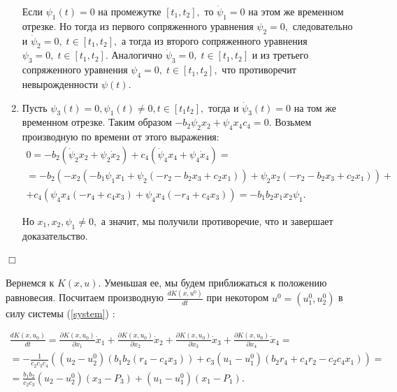 \documentclass[11pt]{article}
\newenvironment{Proof}
{\par\noindent{\bf Доказательство.\\}} 
{\begin{flushright}$\Box$\end{flushright}}
\newcommand\Ref[1]{(\ref{#1})}
\newcommand\RS{\Ref{system} }
\newcommand\dd[2]{\frac{\partial#1}{\partial#2}}
\begin{document}
\begin{Proof}
\begin{enumerate}
        Если $\psi_1(t) = 0$ на промежутке $[t_1, t_2],$ то $\dot \psi_1 = 0$ на этом же временном отрезке. Но тогда из первого сопряженного уравнения $\psi_2 = 0,$ следовательно и $\dot \psi_2 = 0, \;  t \in [t_1, t_2],$ а тогда из второго сопряженного уравнения $\psi_3 = 0, \;  t \in [t_1, t_2].$ Аналогично $\dot \psi_3 = 0, \;  t \in [t_1, t_2]$ и из третьего сопряженного уравнения $\psi_4 = 0, \;  t \in [t_1, t_2],$ что противоречит невырожденности $\psi(t).$
        
    \item
    	Пусть $\psi_3(t) = 0, \psi_1(t) \ne 0, t \in [t_1 t_2],$ тогда и $\dot \psi_3(t) = 0$ на том же временном отрезке. Таким образом $-b_2\psi_2x_2 + \psi_4x_4c_4 = 0.$ Возьмем производную по времени от этого выражения:
    	\begin{multline*}
    		0 = -b_2(\dot \psi_2x_2 + \psi_2 \dot x_2) + c_4(\dot \psi_4 x_4 + \psi_4 \dot x_4) = \\
    		= -b_2(-x_2(-b_1\psi_1x_1 + \psi_2(-r_2 - b_2x_3 + c_2x_1)) + \psi_2 x_2(-r_2 - b_2x_3 + c_2x_1)) + \\
    		+ c_4(\psi_4x_4(-r_4 + c_4x_3) + \psi_4x_4(-r_4 + c_4x_3)) = -b_1b_2x_1x_2\psi_1.
    	\end{multline*}
    	
    	Но $x_1, x_2, \psi_1 \ne 0,$ а значит, мы получили противоречие, что и завершает доказательство.
    
    \end{enumerate}    
\end{Proof}

Вернемся к $K(x,u).$ Уменьшая ее, мы будем приближаться к положению равновесия. 
Посчитаем производную $\frac{dK(x,u^0)}{dt}$ при некотором $u^0 = (u_1^0, u_2^0)$ в силу системы \RS:

\begin{multline*}
    \frac{dK(x,u_0)}{dt} = \dd{K(x,u_0)}{x_1}\dot x_1 + \dd{K(x,u_0)}{x_2}\dot x_2 + \dd{K(x,u_0)}{x_3}\dot x_3 + \dd{K(x,u_0)}{x_4}\dot x_4 = \\
    = -\frac{1}{c_2c_3c_4}\left((u_2 - u_2^0)(b_1b_2(r_4 - c_4x_3)) + c_3(u_1 - u_1^0)(b_2r_4 + c_4r_2 - c_2c_4x_1)\right) = \\
    = \frac{b_1b_2}{c_2c_3}(u_2 - u_2^0)(x_3 - P_3) + (u_1 - u_1^0)(x_1 - P_1).
\end{multline*}
\end{document}
